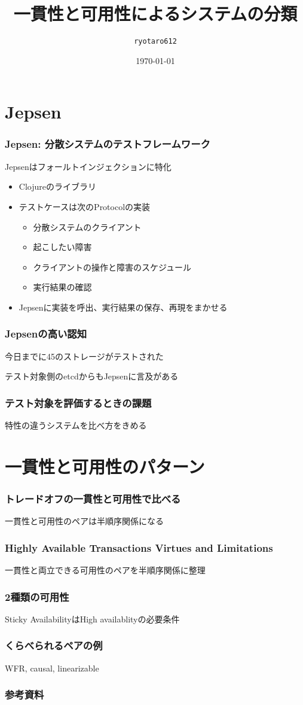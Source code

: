 \documentclass[unicode, 14pt, aspectratio=169]{beamer}
\date{\today}
\title{一貫性と可用性によるシステムの分類}
\author{\texttt{ryotaro612}}
\begin{document}
\begin{frame}
\titlepage
\end{frame}
\section{Jepsen}
\begin{frame}[t]
  \frametitle{Jepsen: 分散システムのテストフレームワーク\cite{jepsen}}
  {\large Jepsenはフォールトインジェクションに特化}
  \begin{itemize}
  \item Clojureのライブラリ
  \item テストケースは次のProtocolの実装
    \begin{itemize}
    \item 分散システムのクライアント
    \item 起こしたい障害
    \item クライアントの操作と障害のスケジュール
    \item 実行結果の確認
    \end{itemize}
  \item Jepsenに実装を呼出、実行結果の保存、再現をまかせる
  \end{itemize}
\end{frame}
\begin{frame}[t]
  \frametitle{Jepsenの高い認知}
  {\large 今日までに45のストレージがテストされた}
  \par
  テスト対象側のetcdからもJepsenに言及がある
\end{frame}
\begin{frame}[t]
  \frametitle{テスト対象を評価するときの課題}
  {\large 特性の違うシステムを比べ方をきめる}
\end{frame}
\section{一貫性と可用性のパターン}
\begin{frame}[t]
  \frametitle{トレードオフの一貫性と可用性で比べる}
  {\large 一貫性と可用性のペアは半順序関係になる}
\end{frame}
\begin{frame}[t]
  \frametitle{\normalsize{Highly Available Transactions Virtues and Limitations\cite{high}}}
  {\large 一貫性と両立できる可用性のペアを半順序関係に整理}
\end{frame}
\begin{frame}[t]
  \frametitle{2種類の可用性}
  {\large Sticky AvailabilityはHigh availablityの必要条件}
\end{frame}
\begin{frame}[t]
  \frametitle{くらべられるペアの例}
  {\large WFR, causal, linearizable}
\end{frame}
\begin{frame}[allowframebreaks,t]
  \frametitle{参考資料}
  \printbibliography
  \nocite{*}
\end{frame}
\end{document}
